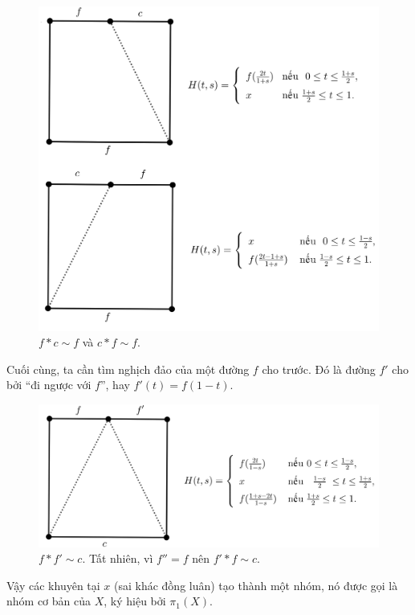 \documentclass[12pt]{article}
\begin{document}
\begin{figure}[h!]
    \centering
    \includegraphics[scale = .25]{h4.png}
    \caption{$f \ast c \sim f$ và $c \ast f \sim f$.}
    \label{h4}
\end{figure}

Cuối cùng, ta cần tìm nghịch đảo của một đường $f$ cho trước. Đó là đường $f'$ cho bởi ``đi ngược với $f$'', hay $f'(t) = f(1-t)$.

\begin{figure}[h!]
    \centering
    \includegraphics[scale = .25]{h5.png}
    \caption{$f \ast f' \sim c$. Tất nhiên, vì $f'' = f$ nên $f' \ast f \sim c$.}
    \label{h5}
\end{figure}

Vậy các khuyên tại $x$ (sai khác đồng luân) tạo thành một nhóm, nó được gọi là nhóm cơ bản của $X$, ký hiệu bởi $\pi_1(X)$.
\end{document}
